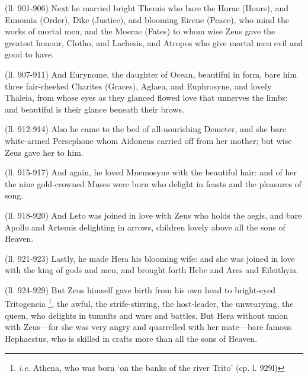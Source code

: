 (ll. 901-906) Next he married bright Themis who bare the Horae (Hours), and
Eunomia (Order), Dike (Justice), and blooming Eirene (Peace), who mind the
works of mortal men, and the Moerae (Fates) to whom wise Zeus gave the greatest
honour, Clotho, and Lachesis, and Atropos who give mortal men evil and good to
have.

(ll. 907-911) And Eurynome, the daughter of Ocean, beautiful in form, bare him
three fair-cheeked Charites (Graces), Aglaea, and Euphrosyne, and lovely
Thaleia, from whose eyes as they glanced flowed love that unnerves the limbs:
and beautiful is their glance beneath their brows.

(ll. 912-914) Also he came to the bed of all-nourishing Demeter, and she bare
white-armed Persephone whom Aidoneus carried off from her mother; but wise Zeus
gave her to him.

(ll. 915-917) And again, he loved Mnemosyne with the beautiful hair: and of her
the nine gold-crowned Muses were born who delight in feasts and the pleasures
of song.

(ll. 918-920) And Leto was joined in love with Zeus who holds the aegis, and
bare Apollo and Artemis delighting in arrows, children lovely above all the
sons of Heaven.

(ll. 921-923) Lastly, he made Hera his blooming wife: and she was joined in
love with the king of gods and men, and brought forth Hebe and Ares and
Eileithyia.

(ll. 924-929) But Zeus himself gave birth from his own head to bright-eyed
Tritogeneia \footnote{\emph{i.e.} Athena, who
was born ‘on the banks of the river Trito’ (cp. l. 929l)}, the awful, the strife-stirring,
the host-leader, the unwearying, the queen, who delights in tumults and wars
and battles. But Hera without union with Zeus—for she was very angry and
quarrelled with her mate—bare famous Hephaestus, who is skilled in crafts
more than all the sons of Heaven.

